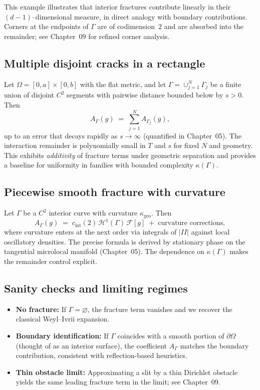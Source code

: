 This example illustrates that interior fractures contribute linearly in
their $(d-1)$–dimensional measure, in direct analogy with boundary
contributions. Corners at the endpoints of $\Gamma$ are of codimension~$2$
and are absorbed into the remainder; see Chapter~09 for refined corner
analysis.

\subsection{Multiple disjoint cracks in a rectangle}
\label{sub:intro-ex-rectangle}

Let $\Omega=[0,a]\times[0,b]$ with the flat metric, and let
$\Gamma=\cup_{j=1}^N \Gamma_j$ be a finite union of disjoint $C^2$ segments
with pairwise distance bounded below by $s>0$. Then
\[
  A_\Gamma(g) \;=\; \sum_{j=1}^N A_{\Gamma_j}(g),
\]
up to an error that decays rapidly as $s\to\infty$ (quantified in
Chapter~05). The interaction remainder is polynomially small in $T$ and $s$
for fixed $N$ and geometry. This exhibits \emph{additivity} of fracture
terms under geometric separation and provides a baseline for uniformity in
families with bounded complexity $\kappa(\Gamma)$.

\subsection{Piecewise smooth fracture with curvature}
\label{sub:intro-ex-curved}

Let $\Gamma$ be a $C^2$ interior curve with curvature $\kappa_{\mathrm{geo}}$.
Then
\[
  A_\Gamma(g) \;=\; c_{\mathrm{int}}(2)\,\mathcal{H}^1(\Gamma)\,\mathcal{F}[g]
    \;+\; \text{curvature corrections},
\]
where curvature enters at the next order via integrals of $|II|$ against
local oscillatory densities. The precise formula is derived by stationary
phase on the tangential microlocal manifold (Chapter~05). The dependence on
$\kappa(\Gamma)$ makes the remainder control explicit.

\subsection{Sanity checks and limiting regimes}
\label{sub:intro-sanity}

\begin{itemize}
  \item \textbf{No fracture:} If $\Gamma=\varnothing$, the fracture term
  vanishes and we recover the classical Weyl–Ivrii expansion.
  \item \textbf{Boundary identification:} If $\Gamma$ coincides with a smooth
  portion of $\partial\Omega$ (thought of as an interior surface), the
  coefficient $A_\Gamma$ matches the boundary contribution, consistent with
  reflection-based heuristics.
  \item \textbf{Thin obstacle limit:} Approximating a slit by a thin Dirichlet
  obstacle yields the same leading fracture term in the limit; see
  Chapter~09.
\end{itemize}

